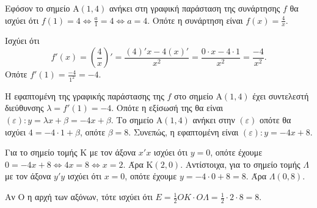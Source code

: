 \begin{alist}
\item Εφόσον το σημείο $\text{A}(1,4)$ ανήκει στη γραφική παράσταση της συνάρτησης $f$ θα
ισχύει ότι $f(1)=4 \Leftrightarrow \frac{a}{1}=4 \Leftrightarrow a=4$. Οπότε η συνάρτηση είναι $f(x)=\frac{4}{x}$.
\item 
\begin{rlist}
\item Ισχύει ότι
\[ f'(x)=\left(\frac{4}{x}\right)'=\frac{(4)'x-4(x)'}{x^2}=\frac{0 \cdot x-4 \cdot 1}{x^2}=\frac{-4}{x^2}. \]
Οπότε $f'(1)=\frac{-4}{1^2}=-4$.
\item Η εφαπτομένη της γραφικής παράστασης της $f$ στο σημείο $\text{A}(1,4)$ έχει
συντελεστή διεύθυνσης $\lambda=f'(1)=-4$.
Οπότε η εξίσωσή της θα είναι $(\varepsilon): y=\lambda x+\beta=-4x+\beta$. Το σημείο $\text{A}(1,4)$ ανήκει στην
$(\varepsilon)$ οπότε θα ισχύει $4=-4 \cdot 1+\beta$, οπότε $\beta=8$.
Συνεπώς, η εφαπτομένη είναι $(\varepsilon): y=-4x+8$.
\end{rlist}
\item 

\begin{rlist}
\item Για το σημείο τομής $\text{K}$ με τον άξονα $x'x$ ισχύει ότι $y=0$, οπότε έχουμε
$0=-4x+8 \Leftrightarrow 4x=8 \Leftrightarrow x=2$. Άρα $\text{K}(2,0)$.
Αντίστοιχα, για το σημείο τομής $\Lambda$ με τον άξονα $y'y$ ισχύει ότι $x=0$, οπότε έχουμε
$y=-4 \cdot 0+8=8$. Άρα $\Lambda(0,8)$.
\item Αν $\text{O}$ η αρχή των αξόνων, τότε ισχύει ότι $E=\frac{1}{2}{OK} \cdot {O\Lambda}=\frac{1}{2} \cdot 2 \cdot 8=8$.

\begin{center}
\end{center}
\end{rlist}
\end{alist}
